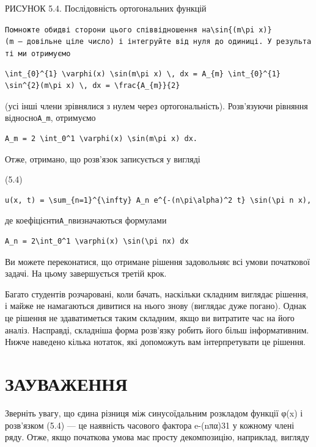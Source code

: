 \documentclass[
  ukrainian,
]{article}
\begin{document}
РИСУНОК 5.4. Послідовність ортогональних функцій

\texttt{Помножте\ обидві\ сторони\ цього\ співвідношення\ на\textquotesingle{}\textbackslash{}sin\{(m\textbackslash{}pi\ x)\}\textquotesingle{}(m\ —\ довільне\ ціле\ число)\ і\ інтегруйте\ від\ нуля\ до\ одиниці.\ У\ результаті\ ми\ отримуємо}

\begin{verbatim}
\int_{0}^{1} \varphi(x) \sin(m\pi x) \, dx = A_{m} \int_{0}^{1} \sin^{2}(m\pi x) \, dx = \frac{A_{m}}{2}
\end{verbatim}

(усі інші члени зрівнялися з нулем через ортогональність). Розв'язуючи
рівняння відносно\texttt{A\_m}, отримуємо

\begin{verbatim}
A_m = 2 \int_0^1 \varphi(x) \sin(m\pi x) dx.
\end{verbatim}

Отже, отримано, що розв'язок записується у вигляді

(5.4)

\begin{verbatim}
u(x, t) = \sum_{n=1}^{\infty} A_n e^{-(n\pi\alpha)^2 t} \sin(\pi n x),
\end{verbatim}

де коефіцієнти\texttt{A\_n}визначаються формулами

\begin{verbatim}
A_n = 2\int_0^1 \varphi(x) \sin(\pi nx) dx
\end{verbatim}

Ви можете переконатися, що отримане рішення задовольняє всі умови
початкової задачі. На цьому завершується третій крок.

Багато студентів розчаровані, коли бачать, наскільки складним виглядає
рішення, і майже не намагаються дивитися на нього знову (виглядає дуже
погано). Однак це рішення не здаватиметься таким складним, якщо ви
витратите час на його аналіз. Насправді, складніша форма розв'язку
робить його більш інформативним. Нижче наведено кілька нотаток, які
допоможуть вам інтерпретувати це рішення.

\section{ЗАУВАЖЕННЯ}\label{ux437ux430ux443ux432ux430ux436ux435ux43dux43dux44f-2}

Зверніть увагу, що єдина різниця між синусоїдальним розкладом функції
φ(x) і розв'язком (5.4) --- це наявність часового фактора e-(nπα)31 у
кожному члені ряду. Отже, якщо початкова умова має просту декомпозицію,
наприклад, вигляду
\end{document}
